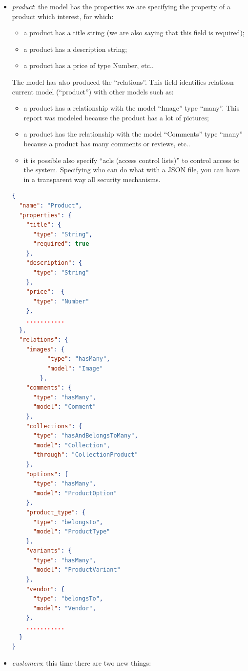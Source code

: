 \begin{itemize}
\item \emph{product}: the model has the properties we are specifying the property of a product which interest, for which:
\begin{itemize}
\item a product has a title string (we are also saying that this field is required);
\item a product has a description string;
\item a product has a price of type Number, etc..
\end{itemize}
The model has also produced the “relations”. This field identifies relatiosn current model (“product”) with other models such as:
\begin{itemize}
\item a product has a relationship with the model “Image” type “many”. This report was modeled because the product has a lot of pictures;
\item a product has the relationship with the model “Comments” type “many” because a product has many comments or reviews, etc..
\item it is possible also specify “acls (access control lists)” to control access to the system. Specifying who can do what with a JSON file, you can have in a transparent way all security mechanisms.
\end{itemize}
\begin{lstlisting}[language=json]
{
  "name": "Product",
  "properties": {
    "title": {
      "type": "String",
      "required": true
    },
    "description": {
      "type": "String"
    },
    "price":  {
      "type": "Number"
    },
    ...........
  },
  "relations": {
    "images": {
          "type": "hasMany",
          "model": "Image"
        },
    "comments": {
      "type": "hasMany",
      "model": "Comment"
    },
    "collections": {
      "type": "hasAndBelongsToMany",
      "model": "Collection",
      "through": "CollectionProduct"
    },
    "options": {
      "type": "hasMany",
      "model": "ProductOption"
    },
    "product_type": {
      "type": "belongsTo",
      "model": "ProductType"
    },
    "variants": {
      "type": "hasMany",
      "model": "ProductVariant"
    },
    "vendor": {
      "type": "belongsTo",
      "model": "Vendor",
    },
    ...........
  }
}
\end{lstlisting}
\item \emph{customers}: this time there are two new things:
\begin{itemize}

\end{itemize}
\end{itemize}
